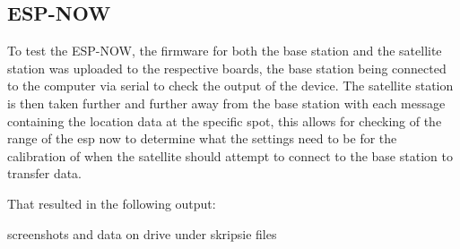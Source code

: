 \subsection{ESP-NOW}
To test the ESP-NOW, the firmware for both the base station and the satellite station was uploaded to the respective boards, the base station being connected to the computer via serial to check the output of the device. The satellite station is then taken further and further away from the base station with each message containing the location data at the specific spot, this allows for checking of the range of the esp now to determine what the settings need to be for the calibration of when the satellite should attempt to connect to the base station to transfer data.

\noindent
That resulted in the following output:

{\color{red} \huge screenshots and data on drive under skripsie files}






